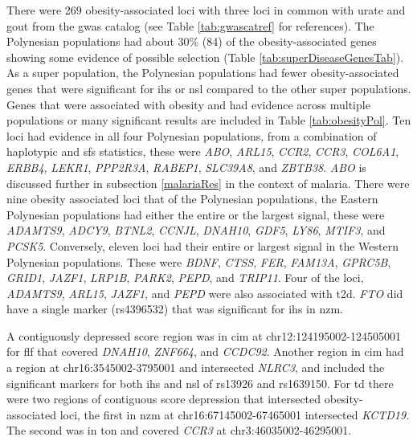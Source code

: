 \documentclass[twoside,openright]{report}
\begin{document}
There were 269 obesity-associated loci with three loci in common with
urate and gout from the \gls{gwas} catalog (see Table
\ref{tab:gwascatref} for references). The Polynesian populations had
about 30\% (84) of the obesity-associated genes showing some evidence of
possible selection (Table \ref{tab:superDiseaseGenesTab}). As a super
population, the Polynesian populations had fewer obesity-associated
genes that were significant for \gls{ihs} or \gls{nsl} compared to the
other super populations. Genes that were associated with obesity and had
evidence across multiple populations or many significant results are
included in Table \ref{tab:obesityPol}. Ten loci had evidence in all
four Polynesian populations, from a combination of haplotypic and
\gls{sfs} statistics, these were \emph{ABO}, \emph{ARL15}, \emph{CCR2},
\emph{CCR3}, \emph{COL6A1}, \emph{ERBB4}, \emph{LEKR1}, \emph{PPP2R3A},
\emph{RABEP1}, \emph{SLC39A8}, and \emph{ZBTB38}. \emph{ABO} is
discussed further in subsection \ref{malariaRes} in the context of
malaria. There were nine obesity associated loci that of the Polynesian
populations, the Eastern Polynesian populations had either the entire or
the largest signal, these were \emph{ADAMTS9}, \emph{ADCY9},
\emph{BTNL2}, \emph{CCNJL}, \emph{DNAH10}, \emph{GDF5}, \emph{LY86},
\emph{MTIF3}, and \emph{PCSK5}. Conversely, eleven loci had their entire
or largest signal in the Western Polynesian populations. These were
\emph{BDNF}, \emph{CTSS}, \emph{FER}, \emph{FAM13A}, \emph{GPRC5B},
\emph{GRID1}, \emph{JAZF1}, \emph{LRP1B}, \emph{PARK2}, \emph{PEPD}, and
\emph{TRIP11}. Four of the loci, \emph{ADAMTS9}, \emph{ARL15},
\emph{JAZF1}, and \emph{PEPD} were also associated with \gls{t2d}.
\emph{FTO} did have a single marker (rs4396532) that was significant for
\gls{ihs} in \gls{nzm}.

A contiguously depressed score region was in \gls{cim} at
chr12:124195002-124505001 for \gls{flf} that covered \emph{DNAH10},
\emph{ZNF664}, and \emph{CCDC92}. Another region in \gls{cim} had a
region at chr16:3545002-3795001 and intersected \emph{NLRC3}, and
included the significant markers for both \gls{ihs} and \gls{nsl} of
rs13926 and rs1639150. For \gls{td} there were two regions of contiguous
score depression that intersected obesity-associated loci, the first in
\gls{nzm} at chr16:67145002-67465001 intersected \emph{KCTD19.} The
second was in \gls{ton} and covered \emph{CCR3} at
chr3:46035002-46295001.

\begingroup\fontsize{6}{8}\selectfont
\end{document}
